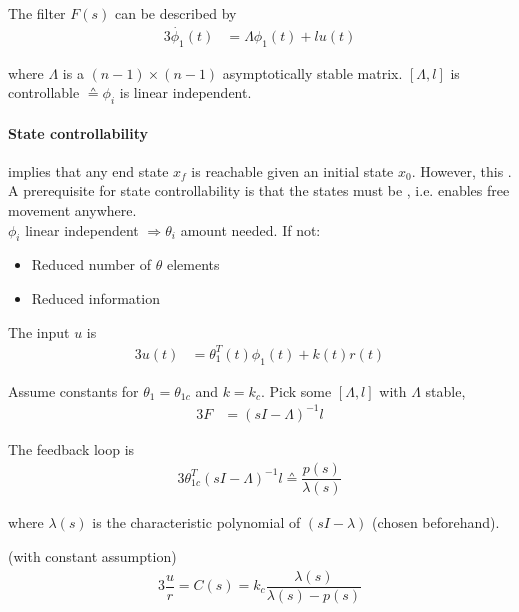 The filter $F(s)$ can be described by
\begin{alignat*}{3}
\dot{ \phi_1}(t) &= \Lambda \phi_1(t) + lu(t)
\end{alignat*}

where $\Lambda$ is a $(n - 1) \times (n - 1)$
asymptotically stable matrix.
$\left[ \Lambda, l \right]$ is controllable
$\corresponds \phi_i$ is linear independent.

\paragraph{State controllability}
implies that any end state $x_f$ is reachable
given an initial state $x_0$.
However, this .
A prerequisite for state controllability is
that the states must be ,
i.e. enables free movement anywhere.\\

$ \phi_i$ linear independent $\Rightarrow \theta_i$
amount needed. If not:
\begin{itemize}
\item Reduced number of $\theta$ elements
\item Reduced information
\end{itemize}

The input $u$ is
\begin{alignat*}{3}
u(t) &= \theta_1^T(t) \phi_1(t) + k(t) r(t)
\end{alignat*}

Assume constants for $ \theta_1 = \theta_{1c}$
and $k = k_c$. Pick some $\left[ \Lambda, l \right]$ 
with $\Lambda$ stable,
\begin{alignat*}{3}
F &= \left( sI - \Lambda \right)^{-1} l
\end{alignat*}

The feedback loop is
\begin{alignat*}{3}
\theta_{1c}^T \left( sI - \Lambda \right)^{-1} l
    \corresponds \dfrac{p(s)}{\lambda(s)}
\end{alignat*}

where $\lambda(s)$ is the characteristic polynomial
of $\left( sI - \lambda \right)$ (chosen beforehand).

(with constant assumption)
\begin{alignat*}{3}
\dfrac{u}{r} = C(s) = k_c \dfrac{\lambda(s)}{\lambda(s) - p(s)}
\end{alignat*}

